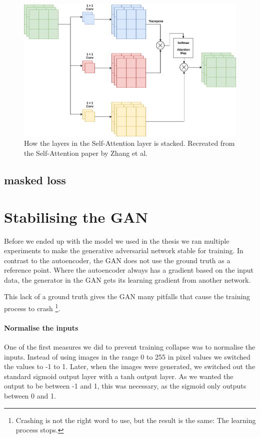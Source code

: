 \begin{figure}[h]
\centering
\includegraphics[scale=0.4]{methodology/figures/attention.png}
\caption{How the layers in the Self-Attention layer is stacked. Recreated from the Self-Attention  paper by Zhang et al.~\cite{DBLP:journals/corr/selfattention}}
\label{fig:Attention}
\end{figure}

        
\subsection{masked loss}

\section{Stabilising the GAN}
Before we ended up with the model we used in the thesis we ran multiple experiments to make the generative adversarial network stable for training. 
In contrast to the autoencoder, the GAN does not use the ground truth as a reference point. Where the autoencoder always has a gradient based on the input data, the generator in the GAN gets its learning gradient from another network.

This lack of a ground truth gives the GAN many pitfalls that cause the training process to crash \footnote{Crashing is not the right word to use, but the result is the same: The learning process stops.}.


\paragraph{Normalise the inputs}
One of the first measures we did to prevent training collapse was to normalise the inputs. Instead of using images in the range 0 to 255 in pixel values we switched the values to  -1 to 1. 
Later, when the images were generated, we switched out the standard sigmoid output layer with a tanh output layer. As we wanted the output to be between -1 and 1, this was necessary, as the sigmoid only outputs between 0 and 1.

